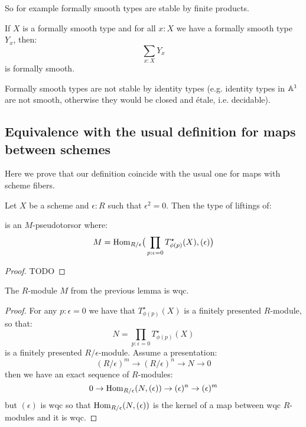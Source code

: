 So for example formally smooth types are stable by finite products. 

\begin{lemma}
If $X$ is a formally smooth type and for all $x:X$ we have a formally smooth type $Y_x$, then:
\[\sum_{x:X}Y_x\]
is formally smooth.
\end{lemma}

Formally smooth types are not stable by identity types (e.g. identity types in $\mathbb{A}^1$ are not smooth, otherwise they would be closed and étale, i.e. decidable).

\subsection{Equivalence with the usual definition for maps between schemes}

Here we prove that our definition coincide with the usual one for maps with scheme fibers.

\begin{lemma}\label{lifting-is-torsor}
Let $X$ be a scheme and $\epsilon:R$ such that $\epsilon^2=0$. Then the type of liftings of:
 \begin{center}
    \end{center} 
is an $M$-pseudotorsor where:
\[M = \mathrm{Hom}_{R/\epsilon}\big(\prod_{p:\epsilon=0}T^\star_{\phi(p)}(X),(\epsilon)\big)\]
\end{lemma}

\begin{proof}
TODO
\end{proof}

\begin{lemma}\label{M-is-wqc}
The $R$-module $M$ from the previous lemma is wqc.
\end{lemma}

\begin{proof}
For any $p:\epsilon=0$ we have that $T^\star_{\phi(p)}(X)$ is a finitely presented $R$-module, so that:
\[N = \prod_{p:\epsilon=0}T^\star_{\phi(p)}(X)\]
is a finitely presented $R/\epsilon$-module. Assume a presentation:
\[
(R/\epsilon)^m \to (R/\epsilon)^n\to N\to 0
\]
then we have an exact sequence of $R$-modules:
\[
0\to \mathrm{Hom}_{R/\epsilon}(N,(\epsilon)) \to (\epsilon)^n\to (\epsilon)^m
\]
but $(\epsilon)$ is wqc so that $\mathrm{Hom}_{R/\epsilon}(N,(\epsilon))$ is the kernel of a map between wqc $R$-modules and it is wqc.
\end{proof}

